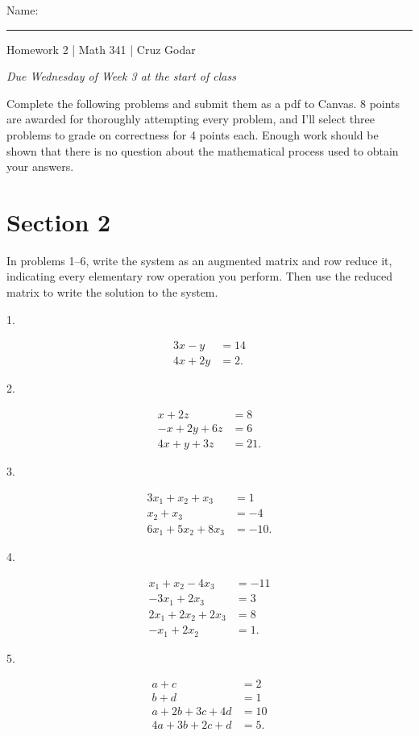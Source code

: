 \documentclass{article}
\begin{document}
\Large Name: \rule{2in}{0.15mm} \hfill Homework 2 | Math 341 | Cruz Godar \vspace{4pt} \normalsize

\textit{Due Wednesday of Week 3 at the start of class}

Complete the following problems and submit them as a pdf to Canvas. 8 points are awarded for thoroughly attempting every problem, and I'll select three problems to grade on correctness for 4 points each. Enough work should be shown that there is no question about the mathematical process used to obtain your answers.

\section{Section 2}

In problems 1--6, write the system as an augmented matrix and row reduce it, indicating every elementary row operation you perform. Then use the reduced matrix to write the solution to the system.

1.

\begin{align*}
	3x - y &= 14\\
	4x + 2y &= 2.
\end{align*}

2.

\begin{align*}
	x + 2z &= 8\\
	-x + 2y + 6z &= 6\\
	4x + y + 3z &= 21.
\end{align*}

3.

\begin{align*}
	3x_1 + x_2 + x_3 &= 1\\
	x_2 + x_3 &= -4\\
	6x_1 + 5x_2 + 8x_3 &= -10.
\end{align*}

4.

\begin{align*}
	x_1 + x_2 - 4x_3 &= -11\\
	-3x_1 + 2x_3 &= 3\\
	2x_1 + 2x_2 + 2x_3 &= 8\\
	-x_1 + 2x_2 &= 1.
\end{align*}

5.

\begin{align*}
	a + c &= 2\\
	b + d &= 1\\
	a + 2b + 3c + 4d &= 10\\
	4a + 3b + 2c + d &= 5.
\end{align*}
\end{document}
